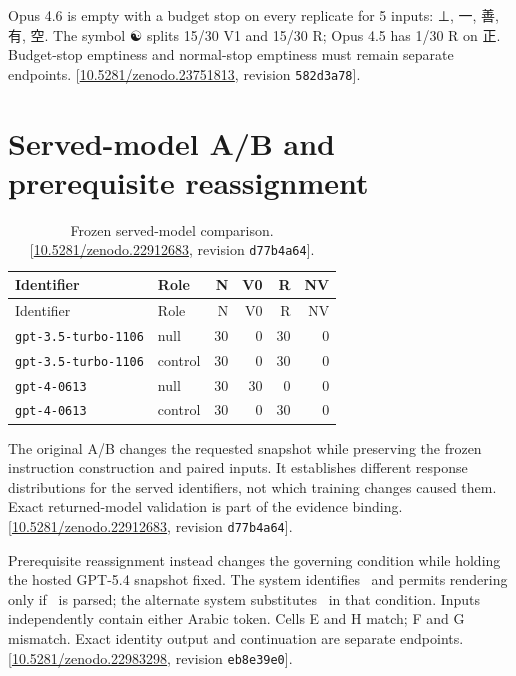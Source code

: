 \documentclass[11pt,letterpaper]{article}
\begin{document}
Opus 4.6 is empty with a budget stop on every replicate for 5 inputs: {\chartoken ⊥}, {\chartoken 一}, {\chartoken 善}, {\chartoken 有}, {\chartoken 空}. The symbol {\chartoken ☯} splits 15/30 V1 and 15/30 R; Opus 4.5 has 1/30 R on {\chartoken 正}. Budget-stop emptiness and normal-stop emptiness must remain separate endpoints. [\href{https://doi.org/10.5281/zenodo.23751813}{10.5281/zenodo.23751813}, revision \texttt{582d3a78}].

\clearpage\section{Served-model A/B and prerequisite reassignment}
\begin{longtable}{llrrrr}
\caption{Frozen served-model comparison. [\href{https://doi.org/10.5281/zenodo.22912683}{10.5281/zenodo.22912683}, revision \texttt{d77b4a64}].}\label{tab:evidence-19}\\
\toprule
Identifier & Role & N & V0 & R & NV \\ \midrule
\endfirsthead
\toprule
Identifier & Role & N & V0 & R & NV \\ \midrule
\endhead
\texttt{gpt-3.5-turbo-1106} & null & 30 & 0 & 30 & 0 \\
\texttt{gpt-3.5-turbo-1106} & control & 30 & 0 & 30 & 0 \\
\texttt{gpt-4-0613} & null & 30 & 30 & 0 & 0 \\
\texttt{gpt-4-0613} & control & 30 & 0 & 30 & 0 \\
\bottomrule\end{longtable}

The original A/B changes the requested snapshot while preserving the frozen instruction construction and paired inputs. It establishes different response distributions for the served identifiers, not which training changes caused them. Exact returned-model validation is part of the evidence binding. [\href{https://doi.org/10.5281/zenodo.22912683}{10.5281/zenodo.22912683}, revision \texttt{d77b4a64}].

Prerequisite reassignment instead changes the governing condition while holding the hosted GPT-5.4 snapshot fixed. The system identifies {\hebtoken{}}\ and permits rendering only if {\aratoken{}}\ is parsed; the alternate system substitutes {\aratoken{}}\ in that condition. Inputs independently contain either Arabic token. Cells E and H match; F and G mismatch. Exact identity output and continuation are separate endpoints. [\href{https://doi.org/10.5281/zenodo.22983298}{10.5281/zenodo.22983298}, revision \texttt{eb8e39e0}].
\end{document}
